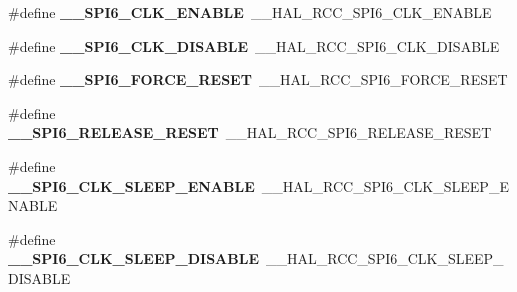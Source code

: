 \begin{DoxyCompactItemize}
\item 
\#define {\bfseries \+\_\+\+\_\+\+S\+P\+I6\+\_\+\+C\+L\+K\+\_\+\+E\+N\+A\+B\+LE}~\+\_\+\+\_\+\+H\+A\+L\+\_\+\+R\+C\+C\+\_\+\+S\+P\+I6\+\_\+\+C\+L\+K\+\_\+\+E\+N\+A\+B\+LE\hypertarget{group___h_a_l___r_c_c___aliased_gaeaff69ae659f6a4c17e27b80ef8a80bc}{}\label{group___h_a_l___r_c_c___aliased_gaeaff69ae659f6a4c17e27b80ef8a80bc}

\item 
\#define {\bfseries \+\_\+\+\_\+\+S\+P\+I6\+\_\+\+C\+L\+K\+\_\+\+D\+I\+S\+A\+B\+LE}~\+\_\+\+\_\+\+H\+A\+L\+\_\+\+R\+C\+C\+\_\+\+S\+P\+I6\+\_\+\+C\+L\+K\+\_\+\+D\+I\+S\+A\+B\+LE\hypertarget{group___h_a_l___r_c_c___aliased_ga52970a8cdb4096533a1ca3221f3464d9}{}\label{group___h_a_l___r_c_c___aliased_ga52970a8cdb4096533a1ca3221f3464d9}

\item 
\#define {\bfseries \+\_\+\+\_\+\+S\+P\+I6\+\_\+\+F\+O\+R\+C\+E\+\_\+\+R\+E\+S\+ET}~\+\_\+\+\_\+\+H\+A\+L\+\_\+\+R\+C\+C\+\_\+\+S\+P\+I6\+\_\+\+F\+O\+R\+C\+E\+\_\+\+R\+E\+S\+ET\hypertarget{group___h_a_l___r_c_c___aliased_ga949e3288b4d1c612cd52f79baa120bcd}{}\label{group___h_a_l___r_c_c___aliased_ga949e3288b4d1c612cd52f79baa120bcd}

\item 
\#define {\bfseries \+\_\+\+\_\+\+S\+P\+I6\+\_\+\+R\+E\+L\+E\+A\+S\+E\+\_\+\+R\+E\+S\+ET}~\+\_\+\+\_\+\+H\+A\+L\+\_\+\+R\+C\+C\+\_\+\+S\+P\+I6\+\_\+\+R\+E\+L\+E\+A\+S\+E\+\_\+\+R\+E\+S\+ET\hypertarget{group___h_a_l___r_c_c___aliased_gaa4d1b74364d9122068fb087811bbdfcf}{}\label{group___h_a_l___r_c_c___aliased_gaa4d1b74364d9122068fb087811bbdfcf}

\item 
\#define {\bfseries \+\_\+\+\_\+\+S\+P\+I6\+\_\+\+C\+L\+K\+\_\+\+S\+L\+E\+E\+P\+\_\+\+E\+N\+A\+B\+LE}~\+\_\+\+\_\+\+H\+A\+L\+\_\+\+R\+C\+C\+\_\+\+S\+P\+I6\+\_\+\+C\+L\+K\+\_\+\+S\+L\+E\+E\+P\+\_\+\+E\+N\+A\+B\+LE\hypertarget{group___h_a_l___r_c_c___aliased_gab55448bad296383401e9fa959560e3f1}{}\label{group___h_a_l___r_c_c___aliased_gab55448bad296383401e9fa959560e3f1}

\item 
\#define {\bfseries \+\_\+\+\_\+\+S\+P\+I6\+\_\+\+C\+L\+K\+\_\+\+S\+L\+E\+E\+P\+\_\+\+D\+I\+S\+A\+B\+LE}~\+\_\+\+\_\+\+H\+A\+L\+\_\+\+R\+C\+C\+\_\+\+S\+P\+I6\+\_\+\+C\+L\+K\+\_\+\+S\+L\+E\+E\+P\+\_\+\+D\+I\+S\+A\+B\+LE\hypertarget{group___h_a_l___r_c_c___aliased_ga16c38d6834e985f3466c21b9d3b68da2}{}\label{group___h_a_l___r_c_c___aliased_ga16c38d6834e985f3466c21b9d3b68da2}


\end{DoxyCompactItemize}
